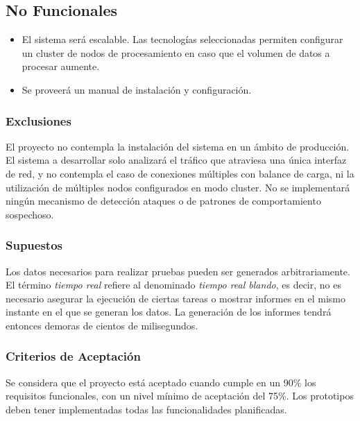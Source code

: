 \subsection*{No Funcionales}
\begin{itemize}
	\item El sistema será escalable. Las tecnologías seleccionadas permiten configurar un cluster de nodos de procesamiento en caso que el volumen de datos a procesar aumente.
	\item Se proveerá un manual de instalación y configuración.
\end{itemize}

\subsubsection{Exclusiones}
El proyecto no contempla la instalación del sistema en un ámbito de producción. El sistema a desarrollar solo analizará el tráfico que atraviesa una única interfaz de red, y no contempla el caso de conexiones múltiples con balance de carga, ni la utilización de múltiples nodos configurados en modo cluster. No se implementará ningún mecanismo de detección ataques o de patrones de comportamiento sospechoso.

\subsubsection{Supuestos}
Los datos necesarios para realizar pruebas pueden ser generados arbitrariamente.
El término \textit{tiempo real} refiere al denominado \textit{tiempo real blando}, es decir, no es necesario asegurar la ejecución de ciertas tareas o mostrar informes en el mismo instante en el que se generan los datos. La generación de los informes tendrá entonces demoras de cientos de milisegundos.

\subsubsection{Criterios de Aceptación}
Se considera que el proyecto está aceptado cuando cumple en un 90\% los requisitos funcionales, con un nivel mínimo de aceptación del 75\%. Los prototipos deben tener implementadas todas las funcionalidades planificadas.